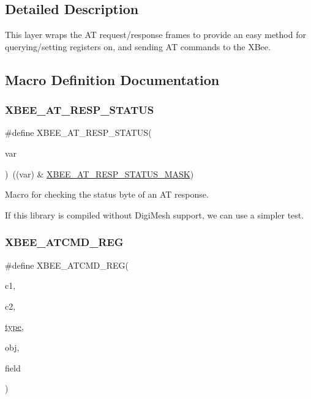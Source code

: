 \subsection{Detailed Description}
This layer wraps the AT request/response frames to provide an easy method for querying/setting registers on, and sending AT commands to the X\+Bee. 



\subsection{Macro Definition Documentation}
\mbox{\label{group__xbee__atcmd_ga4dc292cd07dfd93bbfb2b8632b580949}} 
\subsubsection{\texorpdfstring{X\+B\+E\+E\+\_\+\+A\+T\+\_\+\+R\+E\+S\+P\+\_\+\+S\+T\+A\+T\+US}{XBEE\_AT\_RESP\_STATUS}}
{\footnotesize\ttfamily \#define X\+B\+E\+E\+\_\+\+A\+T\+\_\+\+R\+E\+S\+P\+\_\+\+S\+T\+A\+T\+US(\begin{DoxyParamCaption}\item[{}]{var }\end{DoxyParamCaption})~((var) \& \hyperlink{group__xbee__atcmd_ggac6a27f1b1ee32b75b6f966afbb347f22adb75bf991027151c1aa20a454e278145}{X\+B\+E\+E\+\_\+\+A\+T\+\_\+\+R\+E\+S\+P\+\_\+\+S\+T\+A\+T\+U\+S\+\_\+\+M\+A\+SK})}



Macro for checking the status byte of an AT response. 

If this library is compiled without Digi\+Mesh support, we can use a simpler test. \mbox{\label{group__xbee__atcmd_gaafe33c3d8ea48b42b25d1183eaf93071}} 
\subsubsection{\texorpdfstring{X\+B\+E\+E\+\_\+\+A\+T\+C\+M\+D\+\_\+\+R\+EG}{XBEE\_ATCMD\_REG}}
{\footnotesize\ttfamily \#define X\+B\+E\+E\+\_\+\+A\+T\+C\+M\+D\+\_\+\+R\+EG(\begin{DoxyParamCaption}\item[{}]{c1,  }\item[{}]{c2,  }\item[{}]{\hyperlink{group__zcl_ga1d127017fb298b889f4ba24752d08b8e}{type},  }\item[{}]{obj,  }\item[{}]{field }\end{DoxyParamCaption})}

